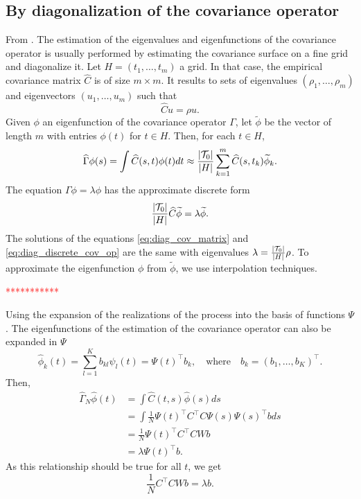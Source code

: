 \subsection{By diagonalization of the covariance operator} %
\label{sub:by_diagonalization_of_the_covariance_operator}

From \cite{ramsayFunctionalDataAnalysis2005}. The estimation of the eigenvalues and eigenfunctions of the covariance operator is usually performed by estimating the covariance surface on a fine grid and diagonalize it. Let $H = (t_1, \dots, t_m)$ a grid. In that case, the empirical covariance matrix $\widehat{C}$ is of size $m \times m$. It results to sets of eigenvalues $(\rho_1, \dots, \rho_m)$ and eigenvectors $(u_1, \dots, u_m)$ such that
\begin{equation}\label{eq:diag_cov_matrix}
 \widehat{C}u = \rho u.
\end{equation}
Given $\phi$ an eigenfunction of the covariance operator $\Gamma$, let $\widetilde{\phi}$ be the vector of length $m$ with entries $\phi(t)$ for $t \in H$. Then, for each $t \in H$, 
\begin{equation}
    \widehat{\Gamma}\phi(s) = \int \widehat{C}(s, t)\phi(t)dt \approx \frac{\lvert \mathcal{T}_{0} \rvert}{\lvert H \rvert} \sum_{k = 1}^m \widehat{C}(s, t_k)\widetilde{\phi}_k.
\end{equation}
The equation $\Gamma \phi = \lambda \phi$ has the approximate discrete form
\begin{equation}\label{eq:diag_discrete_cov_op}
    \frac{\lvert \mathcal{T}_{0} \rvert}{\lvert H \rvert} \widehat{C}\widetilde{\phi} = \lambda \widetilde{\phi}.
\end{equation}
The solutions of the equations \eqref{eq:diag_cov_matrix} and \eqref{eq:diag_discrete_cov_op} are the same with eigenvalues $\lambda = \frac{\lvert \mathcal{T}_{0} \rvert}{\lvert H \rvert}\rho$. To approximate the eigenfunction $\phi$ from $\widetilde{\phi}$, we use interpolation techniques.

\textcolor{red}{***********}

Using the expansion of the realizations of the process into the basis of functions $\Psi$. The eigenfunctions of the estimation of the covariance operator can also be expanded in $\Psi$
\begin{equation}
    \widehat{\phi}_k(t) = \sum_{l = 1}^K b_{kl}\psi_l(t) = \Psi(t)^\top b_k, \quad\text{where}\quad b_k = \left(b_1, \dots, b_K \right)^\top.
\end{equation}
Then,
\begin{align}
\widehat{\Gamma}_N \widehat{\phi}(t) &= \int \widehat{C}(t, s) \widehat{\phi}(s)ds \\
 &= \int \frac{1}{N}\Psi(t)^\top C^\top C \Psi(s) \Psi(s)^\top b ds \\
 &= \frac{1}{N}\Psi(t)^\top C^\top C W b \\
 &= \lambda \Psi(t)^\top b.
\end{align}
As this relationship should be true for all $t$, we get
\begin{equation}
    \frac{1}{N} C^\top C W b = \lambda b.
\end{equation}


